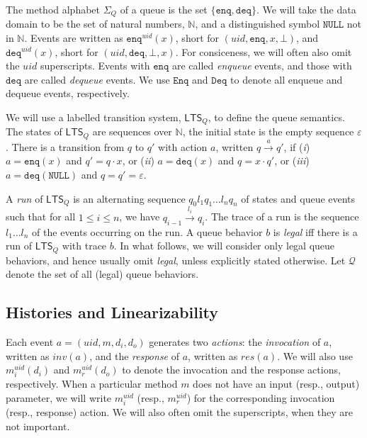 \documentclass{LMCS}
\newcommand{\NULL}{\ensuremath{\mathtt{NULL}}}
\newcommand{\enq}{\ensuremath{\mathtt{enq}}}
\newcommand{\deq}{\ensuremath{\mathtt{deq}}}
\newcommand{\uid}{\ensuremath{\mathit{uid}}}
\newcommand{\ltsq}{\ensuremath{{\mathsf{LTS}}_Q}}
\newcommand{\qtrans}[1]{\ensuremath{\xrightarrow{#1}}}
\newcommand{\enqset}{\ensuremath{\mathtt{Enq}}}
\newcommand{\deqset}{\ensuremath{\mathtt{Deq}}}
\newcommand{\qbehavset}{\ensuremath{\mathcal{Q}}}
\begin{document}
The method alphabet $\Sigma_Q$ of a queue is the set $\{\enq,\deq\}$.
We will take the data domain to be the set of natural numbers, $\mathbb{N}$, and a distinguished symbol {\NULL} not in $\mathbb{N}$.
Events are written as $\enq^\uid(x)$, short for $(\uid,\enq,x,\bot)$, and $\deq^\uid(x)$, short for $(\uid,\deq,\bot,x)$. For consiceness, we will often also omit the $\uid$ superscripts.
Events with {\enq} are called {\em enqueue} events, and those with {\deq} are called {\em dequeue} events.
We use $\enqset$ and $\deqset$ to denote all enqueue and dequeue events, respectively.

We will use a labelled transition system, $\ltsq$, to define the queue semantics.
The states of {\ltsq} are sequences over $\mathbb{N}$, the initial state is the empty sequence $\varepsilon$. 
There is a transition from $q$ to $q'$ with action $a$, written $q\qtrans{a}q'$, if
(\textit{i}) $a=\enq(x)$ and $q'=q\cdot x$, or 
(\textit{ii}) $a=\deq(x)$ and $q=x\cdot q'$, or 
(\textit{iii}) $a=\deq(\NULL)$ and $q=q'=\varepsilon$.

A {\em run} of {\ltsq} is an alternating sequence $q_0l_1q_1\ldots l_nq_n$ of states and queue events such that for all $1\leq i\leq n$, we have $q_{i-1}\qtrans{l_i}q_i$.
The trace of a run is the sequence $l_1\ldots l_n$ of the events occurring on the run.
A queue behavior $b$ is \emph{legal} iff there is a run of {\ltsq} with trace $b$.
In what follows, we will consider only legal queue behaviors, and hence usually omit {\em legal}, unless explicitly stated otherwise.
Let $\qbehavset$ denote the set of all (legal) queue behaviors.


\subsection*{Histories and Linearizability}

Each event $a=(\mathit{uid},m,d_i,d_o)$ generates two {\em actions}: the {\em invocation} of $a$, written as $inv(a)$, and the {\em response} of $a$, written as $res(a)$.
We will also use $m^\uid_i(d_i)$ and $m^\uid_r(d_o)$ to denote the invocation and the response actions, respectively. 
When a particular method $m$ does not have an input (resp., output) parameter, we will write
$m^\uid_i$ (resp., $m^\uid_r$) for the corresponding invocation (resp., response) action. 
We will also often omit the superscripts, when they are not important.
\end{document}
